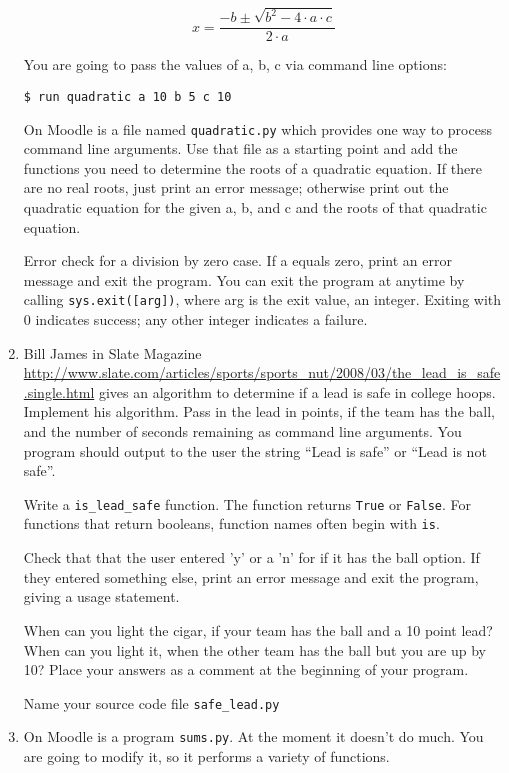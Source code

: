 \documentclass[12pt]{article}
\begin{document}
\begin{enumerate}
  \[x = \frac{-b \pm \sqrt{b^2 - 4 \cdot a \cdot c}}{2 \cdot a} \]

You are going to pass the values of a, b, c via command line options:

\begin{lstlisting}[style=bash]
$ run quadratic a 10 b 5 c 10
\end{lstlisting}

On Moodle is a file named \texttt{quadratic.py} which provides one way to process command line arguments. Use that file as a starting point and add the functions you need to determine the roots of a quadratic equation. If there are no real roots, just print an error message; otherwise print out the quadratic equation for the given a, b, and c and the roots of that quadratic equation. 

Error check for a division by zero case. If a equals zero, print an error message and exit the program. You can exit the program at anytime by calling \texttt{sys.exit([arg])}, where arg is the exit value, an integer. Exiting with 0 indicates success; any other integer indicates a failure.

\item Bill James in Slate Magazine \url{http://www.slate.com/articles/sports/sports_nut/2008/03/the_lead_is_safe.single.html} gives an algorithm to determine if a lead is safe in college hoops. Implement his algorithm. Pass in the lead in points, if the team has the ball, and the number of seconds remaining as command line arguments. You program should output to the user the string ``Lead is safe'' or ``Lead is not safe''. 

  Write a \texttt{is\_lead\_safe} function. The function returns \texttt{True} or \texttt{False}. For functions that return booleans, function names often begin with \texttt{is}.

Check that that the user entered 'y' or a 'n' for if it has the ball option. If they entered something else, print an error message and exit the program, giving a usage statement.

When can you light the cigar, if your team has the ball and a 10 point lead? When can you light it, when the other team has the ball but you are up by 10? Place your answers as a comment at the beginning of your program.

Name your source code file \texttt{safe\_lead.py}

\item On Moodle is a program \texttt{sums.py}. At the moment it doesn't do much. You are going to modify it, so it performs a variety of functions.


\end{enumerate}
\end{document}
